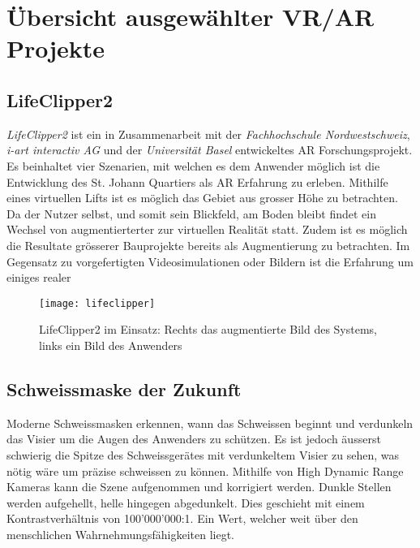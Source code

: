 \chapter{Übersicht ausgewählter VR/AR Projekte}\label{c.projects}
\vspace{-20pt}
\section{LifeClipper2}\label{s.clipper}
\textit{LifeClipper2} ist ein in Zusammenarbeit mit der \textit{Fachhochschule Nordwestschweiz}, \textit{i-art interactiv AG} und der \textit{Universität Basel} entwickeltes AR Forschungsprojekt. Es beinhaltet vier Szenarien, mit welchen es dem Anwender möglich ist die Entwicklung des St. Johann Quartiers als AR Erfahrung zu erleben. Mithilfe eines virtuellen Lifts ist es möglich das Gebiet aus grosser Höhe zu betrachten. Da der Nutzer selbst, und somit sein Blickfeld, am Boden bleibt findet ein Wechsel von augmentierterter zur virtuellen Realität statt. Zudem ist es möglich die Resultate grösserer Bauprojekte bereits als Augmentierung zu betrachten. Im Gegensatz zu vorgefertigten Videosimulationen oder Bildern ist die Erfahrung um einiges realer \cite[S.~172~ff.]{website:lifeclipper}\\[6pt]

\begin{figure}[ht]
	\vspace{-15pt}
	\begin{center}
		\texttt{[image: lifeclipper]}
	\end{center}
	\vspace{-15pt}
	\caption[LifeClipper2 im Einsatz]{LifeClipper2 im Einsatz: Rechts das augmentierte Bild des Systems, links ein Bild des Anwenders}\label{lifeclipper}
	\vspace{-10pt}
\end{figure}


\section{Schweissmaske der Zukunft}\label{s.welding}
Moderne Schweissmasken erkennen, wann das Schweissen beginnt und verdunkeln das Visier um die Augen des Anwenders zu schützen. Es ist jedoch äusserst schwierig die Spitze des Schweissgerätes mit verdunkeltem Visier zu sehen, was nötig wäre um präzise schweissen zu können. Mithilfe von High Dynamic Range Kameras kann die Szene aufgenommen und korrigiert werden. Dunkle Stellen werden aufgehellt, helle hingegen abgedunkelt. Dies geschieht mit einem Kontrastverhältnis von 100'000'000:1. Ein Wert, welcher weit über den menschlichen Wahrnehmungsfähigkeiten liegt.\\[6pt]

